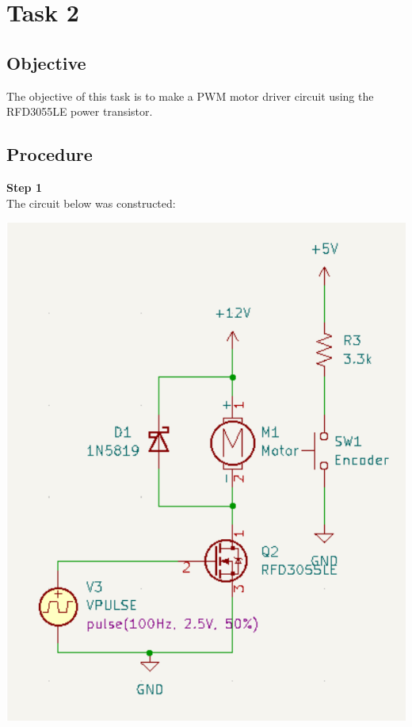 \documentclass[notitlepage, 12pt]{report}  %
\begin{document}
\newpage

\section*{Task 2}

\subsection*{Objective}
\indent\indent The objective of this task is to make a PWM motor driver circuit using the RFD3055LE power transistor.

\subsection*{Procedure}
\indent\indent \textbf{Step 1}\\
The circuit below was constructed:

\begin{center}
    \includegraphics[scale=0.2]{task2.png}
\end{center}    
\end{document}
